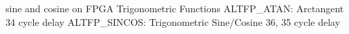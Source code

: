 sine and cosine on FPGA
Trigonometric Functions
ALTFP_ATAN: Arctangent 34 cycle delay
ALTFP_SINCOS: Trigonometric Sine/Cosine 36, 35 cycle delay